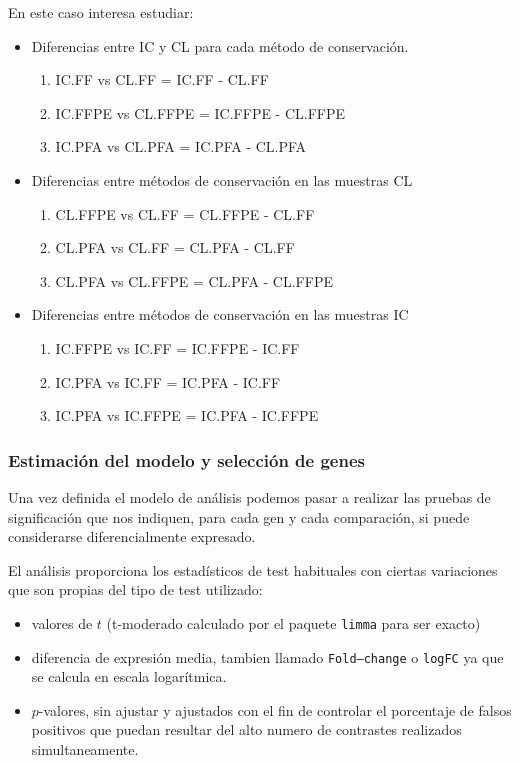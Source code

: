 \documentclass[a4paper]{article}\usepackage[]{graphicx}\usepackage[]{color}
\begin{document}
En este caso interesa estudiar:
\begin{itemize}
\item Diferencias entre IC y CL para cada método de conservación.
  \begin{enumerate}
    \item IC.FF vs CL.FF = IC.FF - CL.FF
    \item IC.FFPE vs CL.FFPE = IC.FFPE - CL.FFPE
    \item IC.PFA vs CL.PFA = IC.PFA - CL.PFA 
  \end{enumerate}
\item Diferencias entre métodos de conservación en las muestras CL
   \begin{enumerate}
    \item CL.FFPE vs CL.FF = CL.FFPE - CL.FF 
    \item CL.PFA vs CL.FF =  CL.PFA - CL.FF
    \item CL.PFA vs CL.FFPE = CL.PFA - CL.FFPE 
  \end{enumerate}
\item Diferencias entre métodos de conservación en las muestras IC
\begin{enumerate}
    \item IC.FFPE vs IC.FF = IC.FFPE - IC.FF 
    \item IC.PFA vs IC.FF =  IC.PFA - IC.FF
    \item IC.PFA vs IC.FFPE = IC.PFA - IC.FFPE 
  \end{enumerate}
\end{itemize}



\subsubsection{Estimación del modelo y selección de genes}

Una vez definida el modelo de
análisis %
podemos pasar a %
realizar las pruebas de significación que nos indiquen, para cada gen
y cada comparación, si puede considerarse diferencialmente expresado.




El análisis proporciona los estadísticos de test habituales con
ciertas variaciones que son propias del tipo de test utilizado:
\begin{itemize}
\item valores de $t$ (t-moderado calculado por el paquete \texttt{limma} para ser exacto)
\item diferencia de expresión media, tambien llamado \texttt{Fold--change} o \texttt{logFC} ya que se calcula en escala logarítmica.
\item $p$-valores, sin ajustar y ajustados con el fin de controlar el porcentaje
de falsos positivos que puedan resultar del alto numero de contrastes
realizados simultaneamente.
\end{itemize}
\end{document}
